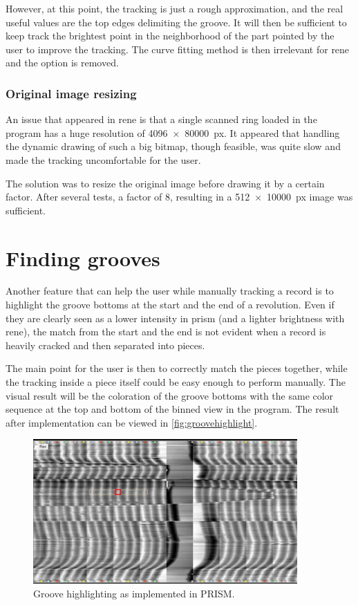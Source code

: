 However, at this point, the tracking is just a rough approximation, and the real useful values are the top edges delimiting the groove. It will then be sufficient to keep track the brightest point in the neighborhood of the part pointed by the user to improve the tracking. The curve fitting method is then irrelevant for \gls{rene} and the option is removed.

\subsubsection{Original image resizing}

An issue that appeared in \gls{rene} is that a single scanned ring loaded in the program has a huge resolution of \SI[product-units=single]{4096x80000}{px}. It appeared that handling the dynamic drawing of such a big bitmap, though feasible, was quite slow and made the tracking uncomfortable for the user.

The solution was to resize the original image before drawing it by a certain factor. After several tests, a factor of 8, resulting in a \SI[product-units=single]{512x10000}{px} image was sufficient.

\section{Finding grooves}
\label{sec:groovebot}

Another feature that can help the user while manually tracking a record is to highlight the groove bottoms at the start and the end of a revolution. Even if they are clearly seen as a lower intensity in \gls{prism} (and a lighter brightness with \gls{rene}), the match from the start and the end is not evident when a record is heavily cracked and then separated into pieces.

The main point for the user is then to correctly match the pieces together, while the tracking inside a piece itself could be easy enough to perform manually. The visual result will be the coloration of the groove bottoms with the same color sequence at the top and bottom of the binned view in the program. The result after implementation can be viewed in \autoref{fig:groovehighlight}.

\begin{figure}[!ht]
\centering
\includegraphics[width=0.9\textwidth]{images/groove-highlight}
\caption{Groove highlighting as implemented in PRISM.}
\label{fig:groovehighlight}
\end{figure}

